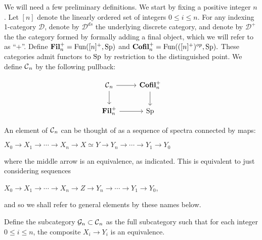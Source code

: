 



We will need a few preliminary definitions.  We start by fixing a positive integer $n$.  
Let $[n]$ denote the linearly ordered set of integers $0\leq i\leq n$. For any indexing 1-category $\mathcal{D}$, denote by $\mathcal{D}^{ds}$ the underlying discrete category, and denote by $\mathcal{D}^+$ the the category formed by formally adding a final object, which we will refer to as ``$+$''.  Define $\operatorname{\mathbf{Fil}}_n^+ = \operatorname{\text{Fun}}([n]^+, \operatorname{\mathrm{Sp}})$ and $\operatorname{\mathbf{Cofil}}_n^+ = \operatorname{\text{Fun}}(([n]^+)^{op},\operatorname{\mathrm{Sp}}).$  These categories admit functors to $\operatorname{\mathrm{Sp}}$ by restriction to the distinguished point.  We define $\operatorname{\mathcal{C}}_n$ by the following pullback:

$$
\begin{tikzcd}
\C_n \arrow[r] \arrow[d]&  \Cofil_n^+ \arrow[d]\\
\Fil_n^+ \arrow[r]& \Sp
\end{tikzcd}
$$


An element of $\operatorname{\mathcal{C}}_n$ can be thought of as a sequence of spectra connected by maps:
\begin{center}
$X_0 \longrightarrow X_1 \longrightarrow \cdots \longrightarrow X_n \longrightarrow X \simeq Y \longrightarrow Y_n \longrightarrow \cdots \longrightarrow Y_1 \longrightarrow Y_0$
\end{center}
where the middle arrow is an equivalence, as indicated.  This is equivalent to just considering sequences
\begin{center}
$X_0 \longrightarrow X_1 \longrightarrow \cdots \longrightarrow X_n \longrightarrow Z \longrightarrow Y_n \longrightarrow \cdots \longrightarrow Y_1 \longrightarrow Y_0$,
\end{center}
and so we shall refer to general elements by these names below.   


Define the subcategory $\mathcal{G}_n\subset \operatorname{\mathcal{C}}_n$ as the full subcategory such that for each integer $0\leq i\leq n$, the composite $X_i \longrightarrow Y_i$ is an equivalence.  

